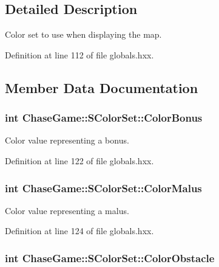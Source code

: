 \subsection{Detailed Description}
Color set to use when displaying the map. 

Definition at line 112 of file globals.\-hxx.



\subsection{Member Data Documentation}
\hypertarget{struct_chase_game_1_1_s_color_set_aacd34496b36640358ecae127f6bb6cc4}{
\subsubsection[{Color\-Bonus}]{\setlength{\rightskip}{0pt plus 5cm}int Chase\-Game\-::\-S\-Color\-Set\-::\-Color\-Bonus}}\label{struct_chase_game_1_1_s_color_set_aacd34496b36640358ecae127f6bb6cc4}


Color value representing a bonus. 



Definition at line 122 of file globals.\-hxx.

\hypertarget{struct_chase_game_1_1_s_color_set_aa2eb52b7d1fb4059da9935a230715498}{
\subsubsection[{Color\-Malus}]{\setlength{\rightskip}{0pt plus 5cm}int Chase\-Game\-::\-S\-Color\-Set\-::\-Color\-Malus}}\label{struct_chase_game_1_1_s_color_set_aa2eb52b7d1fb4059da9935a230715498}


Color value representing a malus. 



Definition at line 124 of file globals.\-hxx.

\hypertarget{struct_chase_game_1_1_s_color_set_acb1e4df5c042ae8ca8a66d7de26a9148}{
\subsubsection[{Color\-Obstacle}]{\setlength{\rightskip}{0pt plus 5cm}int Chase\-Game\-::\-S\-Color\-Set\-::\-Color\-Obstacle}}\label{struct_chase_game_1_1_s_color_set_acb1e4df5c042ae8ca8a66d7de26a9148}


